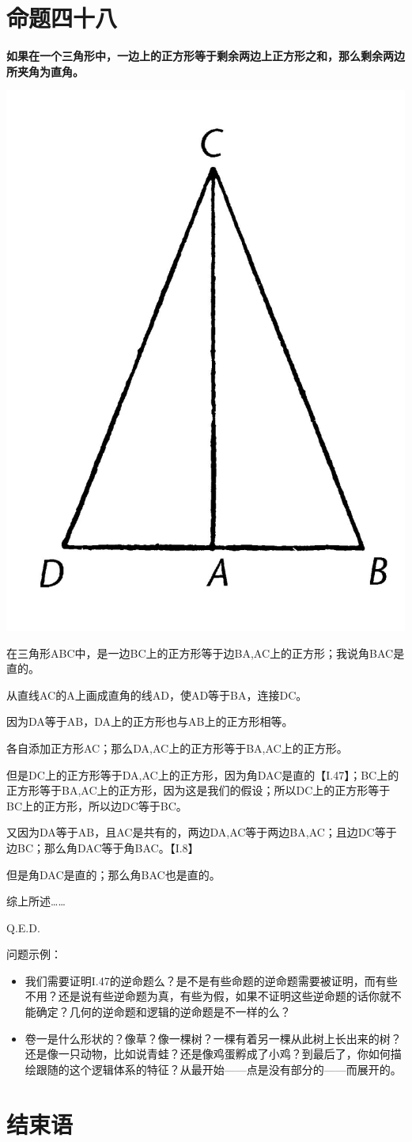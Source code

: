 \documentclass[
]{book}
\providecommand{\tightlist}{%
  \setlength{\itemsep}{0pt}\setlength{\parskip}{0pt}}
\begin{document}
\hypertarget{ux547dux9898ux56dbux5341ux516b}{%
\section{命题四十八}\label{ux547dux9898ux56dbux5341ux516b}}

\textbf{如果在一个三角形中，一边上的正方形等于剩余两边上正方形之和，那么剩余两边所夹角为直角。}

\includegraphics[width=0.2\linewidth]{./image/img558}

在三角形ABC中，是一边BC上的正方形等于边BA,AC上的正方形；我说角BAC是直的。

从直线AC的A上画成直角的线AD，使AD等于BA，连接DC。

因为DA等于AB，DA上的正方形也与AB上的正方形相等。

各自添加正方形AC；那么DA,AC上的正方形等于BA,AC上的正方形。

但是DC上的正方形等于DA,AC上的正方形，因为角DAC是直的【I.47】；BC上的正方形等于BA,AC上的正方形，因为这是我们的假设；所以DC上的正方形等于BC上的正方形，所以边DC等于BC。

又因为DA等于AB，且AC是共有的，两边DA,AC等于两边BA,AC；且边DC等于边BC；那么角DAC等于角BAC。【I.8】

但是角DAC是直的；那么角BAC也是直的。

综上所述\ldots\ldots{}

Q.E.D.

问题示例：

\begin{itemize}
\tightlist
\item
  我们需要证明I.47的逆命题么？是不是有些命题的逆命题需要被证明，而有些不用？还是说有些逆命题为真，有些为假，如果不证明这些逆命题的话你就不能确定？几何的逆命题和逻辑的逆命题是不一样的么？
\item
  卷一是什么形状的？像草？像一棵树？一棵有着另一棵从此树上长出来的树？还是像一只动物，比如说青蛙？还是像鸡蛋孵成了小鸡？到最后了，你如何描绘跟随的这个逻辑体系的特征？从最开始------点是没有部分的------而展开的。
\end{itemize}

\hypertarget{ux7ed3ux675fux8bed}{%
\section*{结束语}\label{ux7ed3ux675fux8bed}}
\end{document}
